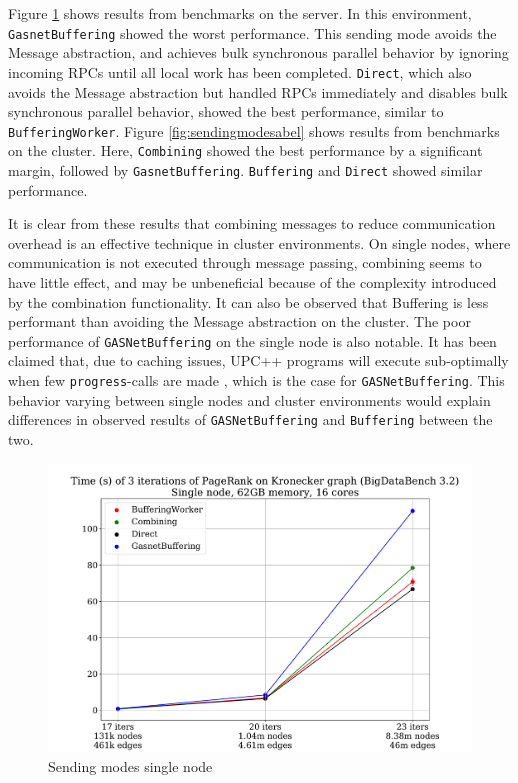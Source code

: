 \documentclass{uit-report}
\begin{document}
Figure \ref{fig:sendingmodes} shows results from benchmarks on the server. In this environment, \\\texttt{GasnetBuffering} showed the worst performance. This sending mode avoids the Message abstraction, and achieves bulk synchronous parallel behavior by ignoring incoming RPCs until all local work has been completed. \texttt{Direct}, which also avoids the Message abstraction but handled RPCs immediately and disables bulk synchronous parallel behavior, showed the best performance, similar to \texttt{BufferingWorker}. Figure \ref{fig:sendingmodesabel} shows results from benchmarks on the cluster. Here, \texttt{Combining} showed the best performance by a significant margin, followed by \texttt{GasnetBuffering}. \texttt{Buffering} and \texttt{Direct} showed similar performance.

It is clear from these results that combining messages to reduce communication overhead is an effective technique in cluster environments. On single nodes, where communication is not executed through message passing, combining seems to have little effect, and may be unbeneficial because of the complexity introduced by the combination functionality.
It can also be observed that Buffering is less performant than avoiding the Message abstraction on the cluster. The poor performance of \texttt{GASNetBuffering} on the single node is also notable. It has been claimed that, due to caching issues, UPC++ programs will execute sub-optimally when few \texttt{progress}-calls are made \cite{gasneteventissues}, which is the case for \texttt{GASNetBuffering}. This behavior varying between single nodes and cluster environments would explain differences in observed results of \texttt{GASNetBuffering} and \texttt{Buffering} between the two.



\newpage
\begin{figure}[H]
	\centering
	\includegraphics[width=15cm]{illustrations/sendingmodes.pdf}
	\caption{Sending modes single node}
	\label{fig:sendingmodes}
\end{figure}
\end{document}
